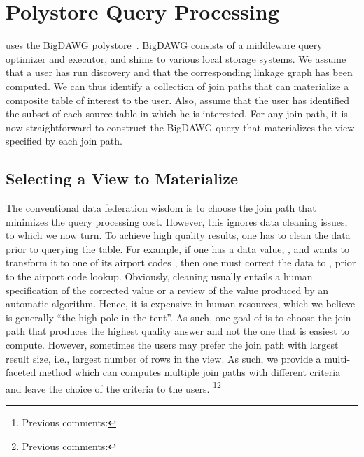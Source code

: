 \section{Polystore Query Processing}
\label{sec:curating}

\dcv uses the BigDAWG polystore~\cite{DBLP:journals/pvldb/ElmoreDSBCGHHKK15}. 
BigDAWG  consists of a middleware query optimizer and executor, and shims to various local storage systems.
We assume that a user has run discovery and that the corresponding linkage graph has been computed. 
We can thus identify a collection of join paths that can materialize a composite table of interest to the user.  
Also, assume that the user has identified the subset of each source table in which he is interested. 
For any join path, it is now straightforward to construct the BigDAWG query that materializes the view specified by each join path. 

\subsection{Selecting a View to Materialize}



The conventional data federation wisdom is to choose the join path that minimizes the query processing cost. However, this ignores data cleaning issues, to which we now turn. To achieve high quality results, one has to clean the data prior to querying the table. For example, if one has a data value, , and wants to transform it to one of its airport codes , then one must correct the data to , prior to the airport code lookup. Obviously, cleaning usually entails a human specification of the corrected value or a review of the value produced by an automatic algorithm. Hence, it is expensive in human resources, which we believe is generally ``the high pole in the tent''. As such, one goal of \dcv is to choose the join path that produces the highest quality answer and not the one that is easiest to compute. However, sometimes the users may prefer the join path with largest result size, i.e., largest number of rows in the view. As such, we provide a multi-faceted method which can computes multiple join paths with different criteria  and leave the choice of the criteria to the users. \footnote{Previous comments: }\footnote{Previous comments: }


